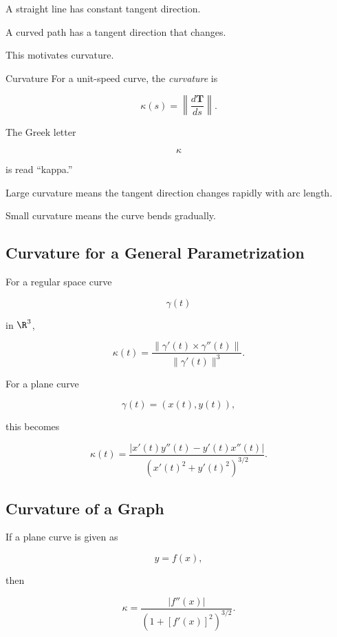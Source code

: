 A straight line has constant tangent direction.

A curved path has a tangent direction that changes.

This motivates curvature.

\begin{definitionbox}{Curvature}
For a unit-speed curve, the \emph{curvature} is

\[
\boxed{
\kappa(s)
=
\left\|
\frac{d\mathbf{T}}{ds}
\right\|.
}
\]
\end{definitionbox}

The Greek letter

\[
\kappa
\]

is read ``kappa.''

Large curvature means the tangent direction changes rapidly with arc length.

Small curvature means the curve bends gradually.

\subsection{Curvature for a General Parametrization}
\label{subsec:general-curve-curvature}

For a regular space curve

\[
\gamma(t)
\]

in \(\R^3\),

\[
\boxed{
\kappa(t)
=
\frac{
\|\gamma'(t)\times\gamma''(t)\|
}{
\|\gamma'(t)\|^3
}.
}
\]

For a plane curve

\[
\gamma(t)=(x(t),y(t)),
\]

this becomes

\[
\boxed{
\kappa(t)
=
\frac{
|x'(t)y''(t)-y'(t)x''(t)|
}{
\left(x'(t)^2+y'(t)^2\right)^{3/2}
}.
}
\]

\subsection{Curvature of a Graph}
\label{subsec:graph-curvature}

If a plane curve is given as

\[
y=f(x),
\]

then

\[
\boxed{
\kappa
=
\frac{|f''(x)|}
{\left(1+[f'(x)]^2\right)^{3/2}}.
}
\]

